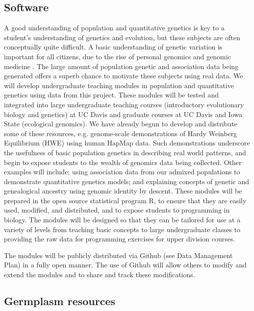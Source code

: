 \subsection*{Software} %

A good understanding of population and quantitative genetics is key to a student's understanding of genetics and evolution, but these subjects are often conceptually quite difficult.  A basic understanding of genetic variation is important for all citizens, due to the rise of personal genomics and genomic medicine \citep[e.g.][]{redfield2012}. The large amount of population genetic and association data being generated offers a superb chance to motivate these subjects using real data. 
We will develop undergraduate teaching modules in population and quantitative genetics using data from this project. These modules will be tested and integrated into large undergraduate teaching courses (introductory evolutionary biology and genetics) at UC Davis and graduate courses at UC Davis and Iowa State (ecological genomics). We have already begun to develop and distribute some of these resources, e.g. genome-scale demonstrations of Hardy Weinberg Equilibrium (HWE) using  human HapMap data. Such demonstrations underscore the usefulness of basic population genetics in describing real world patterns, and begin to expose students to the wealth of genomics data being collected. 
Other examples will include: using association data from our admixed populations to demonstrate quantitative genetics models; and explaining concepts of genetic and genealogical ancestry using genomic identity by descent.  These modules will be prepared in the open source statistical program R, to ensure that they are easily used, modified, and distributed, and to expose students to programming in biology. The modules will be designed so that they can be tailored for use at a variety of levels from teaching basic concepts to large undergraduate classes to providing the raw data for programming exercises for upper division courses.

The modules will be publicly distributed via Github (see Data Management Plan) in a fully open manner. The use of Github will allow others to modify and extend the modules and to share and track these modifications. 

\subsection*{Germplasm resources} %

